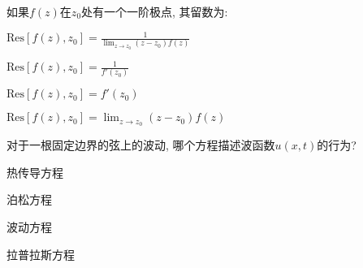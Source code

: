 \documentclass{njustexam}
\begin{document}
\begin{problem}
  如果$f(z)$在$z_0$处有一个一阶极点, 其留数为:
\begin{abcd}
  \item $\text{Res}[f(z),  z_0] = \frac{1}{\lim_{z \to z_0} (z - z_0)f(z)}$
  \item $\text{Res}[f(z),  z_0] = \frac{1}{f'(z_0)}$
  \item $\text{Res}[f(z),  z_0] = f'(z_0)$
   \item $\text{Res}[f(z),  z_0] = \lim_{z \to z_0} (z - z_0)f(z)$
\end{abcd}
\end{problem}










\begin{problem}
  对于一根固定边界的弦上的波动, 哪个方程描述波函数$u(x,  t)$的行为?
  \begin{abcd}
    \item 热传导方程 
    \item 泊松方程
    \item 波动方程
    \item 拉普拉斯方程
    \end{abcd}
\end{problem}



\end{document}
